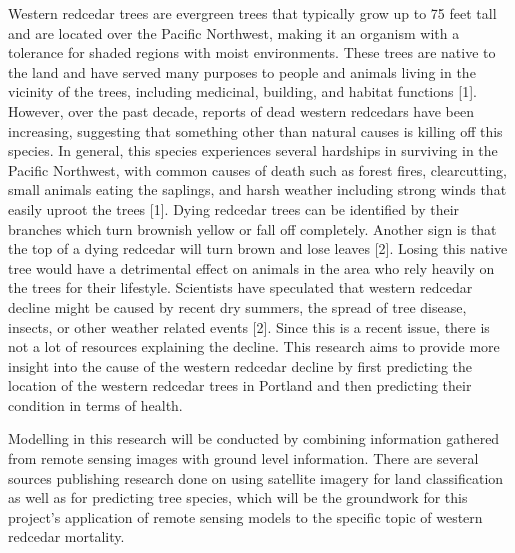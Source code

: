 \documentclass[12pt,twoside]{reedthesis}
\begin{document}
Western redcedar trees are evergreen trees that typically grow up to 75 feet tall and are located over the Pacific Northwest, making it an organism with a tolerance for shaded regions with moist environments. These trees are native to the land and have served many purposes to people and animals living in the vicinity of the trees, including medicinal, building, and habitat functions {[}1{]}. However, over the past decade, reports of dead western redcedars have been increasing, suggesting that something other than natural causes is killing off this species. In general, this species experiences several hardships in surviving in the Pacific Northwest, with common causes of death such as forest fires, clearcutting, small animals eating the saplings, and harsh weather including strong winds that easily uproot the trees {[}1{]}. Dying redcedar trees can be identified by their branches which turn brownish yellow or fall off completely. Another sign is that the top of a dying redcedar will turn brown and lose leaves {[}2{]}. Losing this native tree would have a detrimental effect on animals in the area who rely heavily on the trees for their lifestyle. Scientists have speculated that western redcedar decline might be caused by recent dry summers, the spread of tree disease, insects, or other weather related events {[}2{]}. Since this is a recent issue, there is not a lot of resources explaining the decline. This research aims to provide more insight into the cause of the western redcedar decline by first predicting the location of the western redcedar trees in Portland and then predicting their condition in terms of health.

Modelling in this research will be conducted by combining information gathered from remote sensing images with ground level information. There are several sources publishing research done on using satellite imagery for land classification as well as for predicting tree species, which will be the groundwork for this project's application of remote sensing models to the specific topic of western redcedar mortality.
\end{document}
